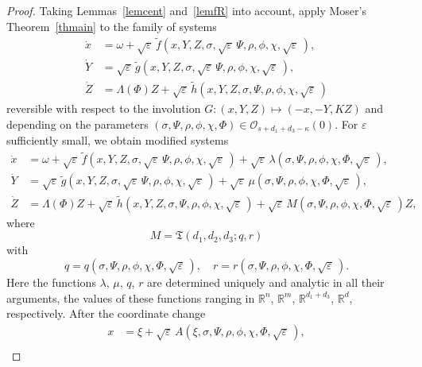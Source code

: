 \documentclass[12pt,reqno]{amsart}
\theoremstyle{definition}
\begin{document}
\begin{proof}
Taking Lemmas~\ref{lemcent} and~\ref{lemfR} into account, apply Moser's
Theorem~\ref{thmain} to the family of systems
\begin{equation}
\begin{aligned}
\dot{x} &= \omega+{{\sqrt{\varepsilon}}\,}{\widetilde{f}}(x,Y,Z,\sigma,{{\sqrt{\varepsilon}}\,}\Psi,\rho,\phi,\chi,{{\sqrt{\varepsilon}}\,}), \\
\dot{Y} &= {{\sqrt{\varepsilon}}\,}{\widetilde{g}}(x,Y,Z,\sigma,{{\sqrt{\varepsilon}}\,}\Psi,\rho,\phi,\chi,{{\sqrt{\varepsilon}}\,}), \\
\dot{Z} &= \Lambda(\Phi)Z+
{{\sqrt{\varepsilon}}\,}{\widetilde{h}}(x,Y,Z,\sigma,\Psi,\rho,\phi,\chi,{{\sqrt{\varepsilon}}\,})
\end{aligned}
\label{eqPhi}
\end{equation}
reversible with respect to the involution $G:(x,Y,Z)\mapsto(-x,-Y,KZ)$ and
depending on the parameters
$(\sigma,\Psi,\rho,\phi,\chi,\Phi)\in{\mathcal O}_{s+d_1+d_3-\kappa}(0)$. For ${\varepsilon}$
sufficiently small, we obtain modified systems
\begin{equation}
\begin{aligned}
\dot{x} &= \omega+{{\sqrt{\varepsilon}}\,}{\widetilde{f}}(x,Y,Z,\sigma,{{\sqrt{\varepsilon}}\,}\Psi,\rho,\phi,\chi,{{\sqrt{\varepsilon}}\,}) +
{{\sqrt{\varepsilon}}\,}\lambda(\sigma,\Psi,\rho,\phi,\chi,\Phi,{{\sqrt{\varepsilon}}\,}), \\
\dot{Y} &= {{\sqrt{\varepsilon}}\,}{\widetilde{g}}(x,Y,Z,\sigma,{{\sqrt{\varepsilon}}\,}\Psi,\rho,\phi,\chi,{{\sqrt{\varepsilon}}\,}) +
{{\sqrt{\varepsilon}}\,}\mu(\sigma,\Psi,\rho,\phi,\chi,\Phi,{{\sqrt{\varepsilon}}\,}), \\
\dot{Z} &= \Lambda(\Phi)Z+
{{\sqrt{\varepsilon}}\,}{\widetilde{h}}(x,Y,Z,\sigma,\Psi,\rho,\phi,\chi,{{\sqrt{\varepsilon}}\,}) +
{{\sqrt{\varepsilon}}\,} M(\sigma,\Psi,\rho,\phi,\chi,\Phi,{{\sqrt{\varepsilon}}\,})Z,
\end{aligned}
\label{eqget}
\end{equation}
where
\[
M={\mathfrak T}(d_1,d_2,d_3;q,r)
\]
with
\[
q=q(\sigma,\Psi,\rho,\phi,\chi,\Phi,{{\sqrt{\varepsilon}}\,}), \quad
r=r(\sigma,\Psi,\rho,\phi,\chi,\Phi,{{\sqrt{\varepsilon}}\,}).
\]
Here the functions $\lambda$, $\mu$, $q$, $r$ are determined uniquely and
analytic in all their arguments, the values of these functions ranging in
${\mathbb R}^n$, ${\mathbb R}^m$, ${\mathbb R}^{d_1+d_3}$, ${\mathbb R}^d$, respectively. After the coordinate
change
\begin{align*}
x &= \xi+{{\sqrt{\varepsilon}}\,} A(\xi,\sigma,\Psi,\rho,\phi,\chi,\Phi,{{\sqrt{\varepsilon}}\,}), \\

\end{align*}
\end{proof}
\end{document}
